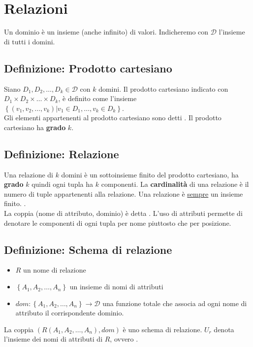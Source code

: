 \documentclass[12pt, a4paper]{report}
\begin{document}
        \section{Relazioni}
            Un dominio è un insieme (anche infinito) di valori. Indicheremo con $\mathcal{D}$ l'insieme di tutti i domini.
            \subsection{Definizione: Prodotto cartesiano}
                Siano $D_{1},D_{2},\ldots,D_{k} \in \mathcal{D} \text{ con } k$ domini. Il prodotto cartesiano indicato con $D_{1}\times D_{2}\times \ldots \times D_{k}$, è definito come l'insieme $\left\{\left(v_{1},v_{2},\ldots,v_{k}\right)|v_{1}\in D_{1},\ldots,v_{k}\in D_{k}\right\}$.\\
                Gli elementi appartenenti al prodotto cartesiano sono detti . Il prodotto cartesiano ha \textbf{grado} $k$.
            \subsection{Definizione: Relazione}
                Una relazione di $k$ domini è un sottoinsieme finito del prodotto cartesiano, ha \textbf{grado} $k$ quindi ogni tupla ha $k$ componenti. La \textbf{cardinalità} di una relazione è il numero di tuple appartenenti alla relazione. Una relazione è \underline{sempre} un insieme finito. .\\
            La coppia (nome di attributo, dominio) è detta . L'uso di attributi permette di denotare le componenti di ogni tupla per nome piuttosto che per posizione.
            \subsection{Definizione: Schema di relazione}
                \begin{itemize}
                    \item $R$ un nome di relazione
                    \item $\left\{A_{1},A_{2},\ldots,A_{n}\right\}$ un insieme di nomi di attributi
                    \item $dom:\left\{A_{1},A_{2},\ldots,A_{n}\right\}\rightarrow \mathcal{D}$ una funzione totale che associa ad ogni nome di attributo il corrispondente dominio.
                \end{itemize}
                La coppia $(R(A_{1},A_{2},\ldots,A_{n}),dom)$ è uno schema di relazione. $U_{r}$ denota l'insieme dei nomi di attributi di $R$, ovvero .
\end{document}
